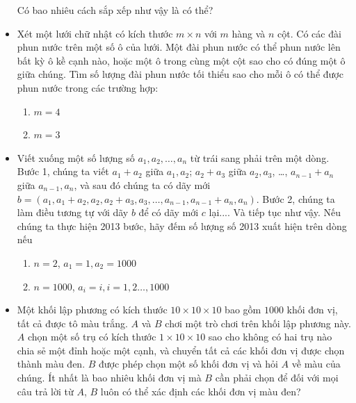 \documentclass[11pt]{scrartcl}
\begin{document}
\begin{itemize}[label=, leftmargin=0em, itemsep=0.5em]
\begin{btvn}
\begin{enumerate}[label=(\alph*)]
        \end{enumerate} 
    Có bao nhiêu cách sắp xếp như vậy là có thể?
    \end{btvn}

    \item \begin{btvn}
    Xét một lưới chữ nhật có kích thước $m\times n$ với $m$ hàng và $n$ cột. Có các đài phun nước trên một số ô của lưới. Một đài phun nước có thể phun nước lên bất kỳ ô kề cạnh nào, hoặc một ô trong cùng một cột sao cho có đúng một ô giữa chúng. Tìm số lượng đài phun nước tối thiểu sao cho mỗi ô có thể được phun nước trong các trường hợp:
    \begin{enumerate}[label=(\alph*)]
        \item $m=4$
        \item $m=3$
    \end{enumerate}
    \end{btvn}

    \item \begin{btvn}
        Viết xuống một số lượng số $a_1, a_2, \ldots, a_n$ từ trái sang phải trên một dòng. Bước 1, chúng ta viết $a_1+a_2$ giữa $a_1,a_2$; $a_2+a_3$ giữa $a_2,a_3$, …, $a_{n-1}+a_n$ giữa $a_{n-1},a_n$, và sau đó chúng ta có dãy mới $b=(a_1, a_1+a_2,a_2,a_2+a_3,a_3, \ldots, a_{n-1}, a_{n-1}+a_n, a_n)$. Bước 2, chúng ta làm điều tương tự với dãy $b$ để có dãy mới $c$ lại.... Và tiếp tục như vậy. Nếu chúng ta thực hiện 2013 bước, hãy đếm số lượng số 2013 xuất hiện trên dòng nếu
        \begin{enumerate}[label=(\alph*)]
            \item $n=2$, $a_1=1, a_2=1000$
            \item $n=1000$, $a_i=i, i=1,2\ldots, 1000$
        \end{enumerate}
    \end{btvn}

    \item \begin{btvn}
        Một khối lập phương có kích thước $10\times 10\times 10$ bao gồm $1000$ khối đơn vị, tất cả được tô màu trắng. $A$ và $B$ chơi một trò chơi trên khối lập phương này. $A$ chọn một số trụ có kích thước $1\times 10\times 10$ sao cho không có hai trụ nào chia sẻ một đỉnh hoặc một cạnh, và chuyển tất cả các khối đơn vị được chọn thành màu đen. $B$ được phép chọn một số khối đơn vị và hỏi $A$ về màu của chúng. Ít nhất là bao nhiêu khối đơn vị mà $B$ cần phải chọn để đối với mọi câu trả lời từ $A$, $B$ luôn có thể xác định các khối đơn vị màu đen?  
    \end{btvn}


\end{itemize}
\end{document}
